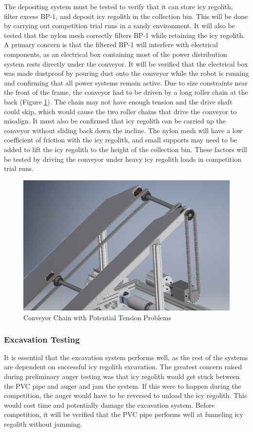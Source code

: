 \documentclass[class=article, crop=false]{standalone}
\begin{document}
	The depositing system must be tested to verify that it can store icy regolith, filter excess BP-1, and deposit icy regolith in the collection bin. This will be done by carrying out competition trial runs in a sandy environment. It will also be tested that the nylon mesh correctly filters BP-1 while retaining the icy regolith. A primary concern is that the filtered BP-1 will interfere with electrical components, as an electrical box containing most of the power distribution system rests directly under the conveyor. It will be verified that the electrical box was made dustproof by pouring dust onto the conveyor while the robot is running and confirming that all power systems remain active.
	Due to size constraints near the front of the frame, the conveyor had to be driven by a long roller chain at the back (Figure \ref{fig:conveyor_chain}). The chain may not have enough tension and the drive shaft could skip, which would cause the two roller chains that drive the conveyor to misalign. It must also be confirmed that icy regolith can be carried up the conveyor without sliding back down the incline. The nylon mesh will have a low coefficient of friction with the icy regolith, and small supports may need to be added to lift the icy regolith to the height of the collection bin. These factors will be tested by driving the conveyor under heavy icy regolith loads in competition trial runs.
	
	\FloatBarrier
		\begin{figure}[h]
			\centering
			\includegraphics[width=0.5\linewidth]{09_Figures/conveyor_roller_chain.png}
			\caption{Conveyor Chain with Potential Tension Problems}
			\label{fig:conveyor_chain}
		\end{figure}
		\FloatBarrier
		
				
		\subsubsection{Excavation Testing}
		
		It is essential that the excavation system performs well, as the rest of the systems are dependent on successful icy regolith excavation. The greatest concern raised during preliminary auger testing was that icy regolith would get stuck between the PVC pipe and auger and jam the system. If this were to happen during the competition, the auger would have to be reversed to unload the icy regolith. This would cost time and potentially damage the excavation system. Before competition, it will be verified that the PVC pipe performs well at funneling icy regolith without jamming. 
		
\end{document}
